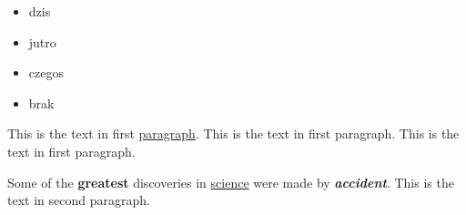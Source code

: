 \begin{itemize}
\renewcommand{\labelitemi}{$>$}
    \item dzis
    \item jutro
    \item czegos
    \item brak
\end{itemize}




\setlength{\parindent}{10ex}
This is the text in first \underline{paragraph}. This is the text in first 
paragraph. This is the text in first paragraph. \par

\vspace{1cm}


\noindent %
Some of the \textbf{greatest} discoveries in \underline{science} were made by \textbf{\emph{accident}}.
This is the text in second paragraph.




